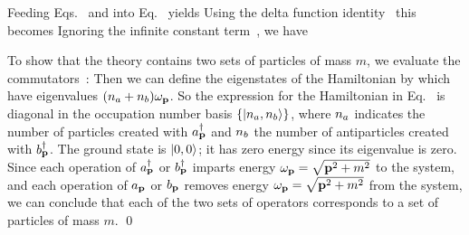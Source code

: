 \documentclass[11pt]{article}
\begin{document}
{	Feeding Eqs.~ and  into Eq.~ yields
	Using the delta function identity~\cite{Dirac}
	this becomes
	Ignoring the infinite constant term~\cite[p.~21]{Peskin}, we have
	
	To show that the theory contains two sets of particles of mass $m$, we evaluate the commutators~\cite[p.~22]{Peskin}:
	Then we can define the eigenstates of the Hamiltonian by
	\eq{
		(\apdag)^{\na} \,(\bpdag)^{\nb} \koo \equiv \knanb,
	}
	which have eigenvalues $(n_a + n_b) \omega_{\vb{p}}$.  So the expression for the Hamiltonian in Eq.~ is diagonal in the occupation number basis $\{ \ket{n_a, n_b} \}$, where $n_a$ indicates the number of particles created with $a_{\vb{p}}^\dagger$ and $n_b$ the number of antiparticles created with $b_{\vb{p}}^\dagger$.  The ground state is $\ket{0, 0}$; it has zero energy since its eigenvalue is zero.  Since each operation of $a_{\vb{p}}^\dagger$ or $b_{\vb{p}}^\dagger$ imparts energy $\omega_{\vb{p}} = \sqrt{\vb{p}^2 + m^2}$ to the system, and each operation of $a_{\vb{p}}$ or $b_{\vb{p}}$ removes energy $\omega_{\vb{p}} = \sqrt{\vb{p}^2 + m^2}$ from the system, we can conclude that each of the two sets of operators corresponds to a set of particles of mass $m$. \qed
}
\end{document}
